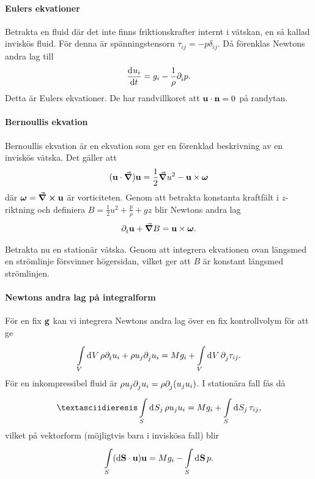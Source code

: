 \paragraph{Eulers ekvationer}
Betrakta en fluid där det inte finns friktionskrafter internt i vätskan, en så kallad inviskös fluid. För denna är spänningstensorn $\tau_{ij} = -p\delta_{ij}$. Då förenklas Newtons andra lag till
\begin{align*}
	\dv[]{u_{i}}{t} = g_{i} - \frac{1}{\rho}\partial_{i}^{}p.
\end{align*}
Detta är Eulers ekvationer. De har randvillkoret att $\vb{u}\cdot\vb{n} = 0$ på randytan.

\paragraph{Bernoullis ekvation}
Bernoullis ekvation är en ekvation som ger en förenklad beskrivning av en inviskös vätska. Det gäller att
\begin{align*}
	(\vb{u}\cdot\grad)\vb{u} = \frac{1}{2}\grad{u^{2}} - \vb{u}\times\vb*{\omega}
\end{align*}
där $\vb*{\omega} = \curl{\vb{u}}$ är vorticiteten. Genom att betrakta konstanta kraftfält i $z$-riktning och definiera $B = \frac{1}{2}u^{2} + \frac{p}{\rho} + gz$ blir Newtons andra lag
\begin{align*}
	\partial_{t}^{}\vb{u} + \grad{B} = \vb{u}\times\vb*{\omega}.
\end{align*}

Betrakta nu en stationär vätska. Genom att integrera ekvationen ovan längsmed en strömlinje försvinner högersidan, vilket ger att $B$ är konstant längsmed strömlinjen.

\paragraph{Newtons andra lag på integralform}
För en fix $\vb{g}$ kan vi integrera Newtons andra lag över en fix kontrollvolym för att ge
\begin{align*}
	\int\limits_{V}^{}\dd[]{V}\rho\partial_{t}^{}u_{i} + \rho u_{j}\partial_{j}^{}u_{i} = Mg_{i} + \int\limits_{V}^{}\dd[]{V}\partial_{j}^{}\tau_{ij}.
\end{align*}
För en inkompressibel fluid är $\rho u_{j}\partial_{j}^{}u_{i} = \rho \partial_{j}^{}(u_{j}u_{i})$. I stationära fall fås då
\begin{align*}
¨	\integ{S}{}{S_{j}}{\rho u_{j}u_{i}} = Mg_{i} + \integ{S}{}{S_{j}}{\tau_{ij}},
\end{align*}
vilket på vektorform (möjligtvis bara i inviskösa fall) blir
\begin{align*}
	\int\limits_{S}(\dd{\vb{S}}\cdot\vb{u})\vb{u} = Mg_{i} - \int\limits_{S}^{}\dd[]{\vb{S}}p.
\end{align*}